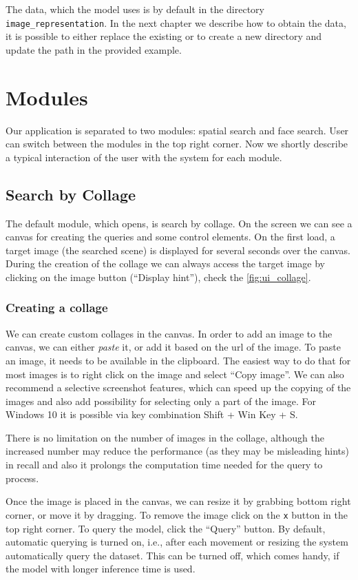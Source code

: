 The data, which the model uses is by default in the directory \verb+image_representation+. In the next chapter we describe how to obtain the data, it is possible to either replace the existing or to create a new directory and update the path in the provided example.

\section{Modules}

Our application is separated to two modules: spatial search and face search. User can switch between the modules in the top right corner. Now we shortly describe a typical interaction of the user with the system for each module.

\subsection{Search by Collage}

The default module, which opens, is search by collage. On the screen we can see a canvas for creating the queries and some control elements. On the first load, a target image (the searched scene) is displayed for several seconds over the canvas. During the creation of the collage we can always access the target image by clicking on the image button (``Display hint''), check the \autoref{fig:ui_collage}.

\subsubsection*{Creating a collage}

We can create custom collages in the canvas. In order to add an image to the canvas, we can either \emph{paste} it, or add it based on the url of the image. To paste an image, it needs to be available in the clipboard. The easiest way to do that for most images is to right click on the image and select ``Copy image''. We can also recommend a selective screenshot features, which can speed up the copying of the images and also add possibility for selecting only a part of the image. For Windows 10 it is possible via key combination Shift + Win Key + S. 

There is no limitation on the number of images in the collage, although the increased number may reduce the performance (as they may be misleading hints) in recall and also it prolongs the computation time needed for the query to process.

Once the image is placed in the canvas, we can resize it by grabbing bottom right corner, or move it by dragging. To remove the image click on the \verb+x+ button in the top right corner. To query the model, click the ``Query'' button. By default, automatic querying is turned on, i.e., after each movement or resizing the system automatically query the dataset. This can be turned off, which comes handy, if the model with longer inference time is used.

